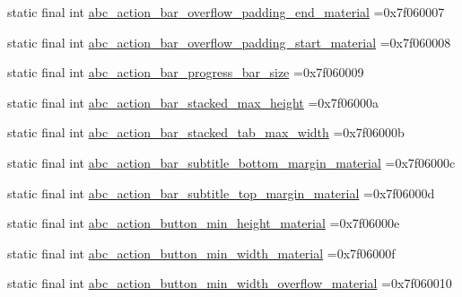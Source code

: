 \begin{DoxyCompactItemize}
\item 
static final int \mbox{\hyperlink{classbr_1_1unb_1_1cic_1_1mp_1_1marketmaster_1_1test_1_1R_1_1dimen_acf611fb542cfe45dbc47581c74268fab}{abc\+\_\+action\+\_\+bar\+\_\+overflow\+\_\+padding\+\_\+end\+\_\+material}} =0x7f060007
\item 
static final int \mbox{\hyperlink{classbr_1_1unb_1_1cic_1_1mp_1_1marketmaster_1_1test_1_1R_1_1dimen_a90c78fa2d63d24d8b901152a5147371f}{abc\+\_\+action\+\_\+bar\+\_\+overflow\+\_\+padding\+\_\+start\+\_\+material}} =0x7f060008
\item 
static final int \mbox{\hyperlink{classbr_1_1unb_1_1cic_1_1mp_1_1marketmaster_1_1test_1_1R_1_1dimen_a282e6fd0f15389e9a584c9d2e0f6008d}{abc\+\_\+action\+\_\+bar\+\_\+progress\+\_\+bar\+\_\+size}} =0x7f060009
\item 
static final int \mbox{\hyperlink{classbr_1_1unb_1_1cic_1_1mp_1_1marketmaster_1_1test_1_1R_1_1dimen_af6a1aa8bc600a74ffb91e83da84568ab}{abc\+\_\+action\+\_\+bar\+\_\+stacked\+\_\+max\+\_\+height}} =0x7f06000a
\item 
static final int \mbox{\hyperlink{classbr_1_1unb_1_1cic_1_1mp_1_1marketmaster_1_1test_1_1R_1_1dimen_a78e00976523295d4641ad848f67190cc}{abc\+\_\+action\+\_\+bar\+\_\+stacked\+\_\+tab\+\_\+max\+\_\+width}} =0x7f06000b
\item 
static final int \mbox{\hyperlink{classbr_1_1unb_1_1cic_1_1mp_1_1marketmaster_1_1test_1_1R_1_1dimen_a1c8567a7bb8f113066995f95b9149fe2}{abc\+\_\+action\+\_\+bar\+\_\+subtitle\+\_\+bottom\+\_\+margin\+\_\+material}} =0x7f06000c
\item 
static final int \mbox{\hyperlink{classbr_1_1unb_1_1cic_1_1mp_1_1marketmaster_1_1test_1_1R_1_1dimen_acef1c929e9a95a87b6c572830361b6e1}{abc\+\_\+action\+\_\+bar\+\_\+subtitle\+\_\+top\+\_\+margin\+\_\+material}} =0x7f06000d
\item 
static final int \mbox{\hyperlink{classbr_1_1unb_1_1cic_1_1mp_1_1marketmaster_1_1test_1_1R_1_1dimen_a1fefc668bccd199179affb85e0e70d82}{abc\+\_\+action\+\_\+button\+\_\+min\+\_\+height\+\_\+material}} =0x7f06000e
\item 
static final int \mbox{\hyperlink{classbr_1_1unb_1_1cic_1_1mp_1_1marketmaster_1_1test_1_1R_1_1dimen_aa8c99a7ccc033bd5ab41b60c7ca2f07e}{abc\+\_\+action\+\_\+button\+\_\+min\+\_\+width\+\_\+material}} =0x7f06000f
\item 
static final int \mbox{\hyperlink{classbr_1_1unb_1_1cic_1_1mp_1_1marketmaster_1_1test_1_1R_1_1dimen_a4893d6b412addf9613a35d024177ef04}{abc\+\_\+action\+\_\+button\+\_\+min\+\_\+width\+\_\+overflow\+\_\+material}} =0x7f060010

\end{DoxyCompactItemize}
